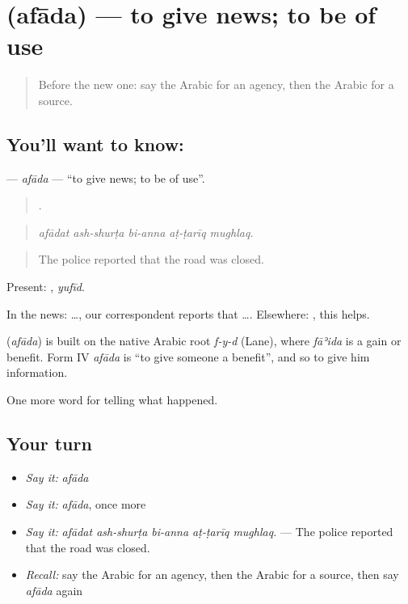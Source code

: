 \section[\texorpdfstring{\ar{أفاد} (afāda)}{أفاد (afāda)}]{ (afāda) — to give news; to be of use}

\label{lesson:AR-C320-afada}



\begin{quote}
Before the new one: say the Arabic for an agency, then the Arabic for a source.
\end{quote}

\subsection*{You'll want to know: }
\textbf{} — \emph{afāda} — \textquotedblleft{}to give news; to be of use\textquotedblright{}.

\begin{quote}
    .
\end{quote}

\begin{quote}
\emph{afādat ash-shurṭa bi-anna aṭ-ṭarīq mughlaq.}
\end{quote}

\begin{quote}
The police reported that the road was closed.
\end{quote}

Present: , \emph{yufīd}.

In the news:    …, our correspondent reports that …. Elsewhere:  , this helps.

\begin{cousinweb}
\textbf{} (\emph{afāda}) is built on the native Arabic root \emph{f-y-d} (Lane), where \emph{fāʾida} is a gain or benefit. Form IV \emph{afāda} is \textquotedblleft{}to give someone a benefit\textquotedblright{}, and so to give him information.
\end{cousinweb}

\begin{grammarlens}[title={What you've built}]
One more word for telling what happened.
\end{grammarlens}

\subsection*{Your turn}
\begin{itemize}
\raggedright
  \item \emph{Say it:} \emph{afāda}
  \item \emph{Say it:} \emph{afāda}, once more
  \item \emph{Say it:} \emph{afādat ash-shurṭa bi-anna aṭ-ṭarīq mughlaq.} — The police reported that the road was closed.
  \item \emph{Recall:} say the Arabic for an agency, then the Arabic for a source, then say \emph{afāda} again
\end{itemize}


